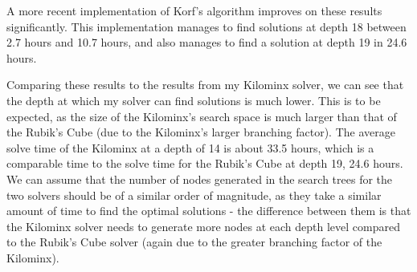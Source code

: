 A more recent implementation of Korf's algorithm \cite{korfimplementation} improves on these results significantly. This implementation manages to find solutions at depth 18 between 2.7 hours and 10.7 hours, and also manages to find a solution at depth 19 in 24.6 hours.

Comparing these results to the results from my Kilominx solver, we can see that the depth at which my solver can find solutions is much lower. This is to be expected, as the size of the Kilominx's search space is much larger than that of the Rubik's Cube (due to the Kilominx's larger branching factor). The average solve time of the Kilominx at a depth of 14 is about 33.5 hours, which is a comparable time to the solve time for the Rubik's Cube at depth 19, 24.6 hours. We can assume that the number of nodes generated in the search trees for the two solvers should be of a similar order of magnitude, as they take a similar amount of time to find the optimal solutions - the difference between them is that the Kilominx solver needs to generate more nodes at each depth level compared to the Rubik's Cube solver (again due to the greater branching factor of the Kilominx).